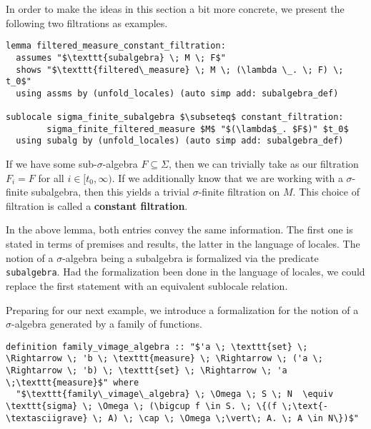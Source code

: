 In order to make the ideas in this section a bit more concrete, we present the following two filtrations as examples.

\begin{isalemma}
{\small
\begin{lstlisting}[style=isabelle]
lemma filtered_measure_constant_filtration:
  assumes "$\texttt{subalgebra} \; M \; F$"
  shows "$\texttt{filtered\_measure} \; M \; (\lambda \_. \; F) \; t_0$"
  using assms by (unfold_locales) (auto simp add: subalgebra_def)

sublocale sigma_finite_subalgebra $\subseteq$ constant_filtration: 
		sigma_finite_filtered_measure $M$ "$(\lambda$_. $F$)" $t_0$
  using subalg by (unfold_locales) (auto simp add: subalgebra_def)
\end{lstlisting}
}
\end{isalemma}

If we have some sub-$\sigma$-algebra $F \subseteq \Sigma$, then we can trivially take as our filtration $F_i = F$ for all $i \in [t_0,\infty)$. If we additionally know that we are working with a $\sigma$-finite subalgebra, then this yields a trivial $\sigma$-finite filtration on $M$. This choice of filtration is called a \textbf{constant filtration}. 

\begin{remark}
	In the above lemma, both entries convey the same information. The first one is stated in terms of premises and results, the latter in the language of locales. The notion of a $\sigma$-algebra being a subalgebra is formalized via the predicate \texttt{subalgebra}. Had the formalization been done in the language of locales, we could replace the first statement with an equivalent sublocale relation.
\end{remark}

Preparing for our next example, we introduce a formalization for the notion of a $\sigma$-algebra generated by a family of functions.

\begin{isadefinition}
{\small
\begin{lstlisting}[style=isabelle]
definition family_vimage_algebra :: "$'a \; \texttt{set} \; \Rightarrow \; 'b \; \texttt{measure} \; \Rightarrow \; ('a \; \Rightarrow \; 'b) \; \texttt{set} \; \Rightarrow \; 'a \;\texttt{measure}$" where
  "$\texttt{family\_vimage\_algebra} \; \Omega \; S \; N  \equiv \texttt{sigma} \; \Omega \; (\bigcup f \in S. \; \{(f \;\text{-\textasciigrave} \; A) \; \cap \; \Omega \;\vert\; A. \; A \in N\})$"
\end{lstlisting}
}
\end{isadefinition}

